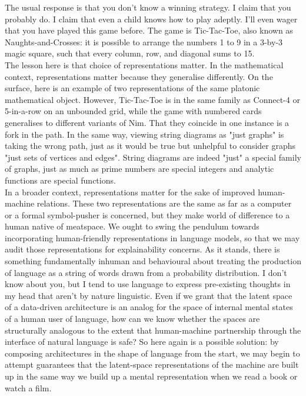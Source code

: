 The usual response is that you don't know a winning strategy. I claim that you probably do. I claim that even a child knows how to play adeptly. I'll even wager that you have played this game before. The game is Tic-Tac-Toe, also known as Naughts-and-Crosses: it is possible to arrange the numbers 1 to 9 in a 3-by-3 magic square, such that every column, row, and diagonal sums to 15.\\

The lesson here is that choice of representations matter. In the mathematical context, representations matter because they generalise differently. On the surface, here is an example of two representations of the same platonic mathematical object. However, Tic-Tac-Toe is in the same family as Connect-4 or 5-in-a-row on an unbounded grid, while the game with numbered cards generalises to different variants of Nim. That they coincide in one instance is a fork in the path. In the same way, viewing string diagrams as "just graphs" is taking the wrong path, just as it would be true but unhelpful to consider graphs "just sets of vertices and edges". String diagrams are indeed "just" a special family of graphs, just as much as prime numbers are special integers and analytic functions are special functions.\\

In a broader context, representations matter for the sake of improved human-machine relations. These two representations are the same as far as a computer or a formal symbol-pusher is concerned, but they make world of difference to a human native of meatspace. We ought to swing the pendulum towards incorporating human-friendly representations in language models, so that we may audit those representations for explainability concerns. As it stands, there is something fundamentally inhuman and behavioural about treating the production of language as a string of words drawn from a probability distribution. I don't know about you, but I tend to use language to express pre-existing thoughts in my head that aren't by nature linguistic. Even if we grant that the latent space of a data-driven architecture is an analog for the space of internal mental states of a human user of language, how can we know whether the spaces are structurally analogous to the extent that human-machine partnership through the interface of natural language is safe? So here again is a possible solution: by composing architectures in the shape of language from the start, we may begin to attempt guarantees that the latent-space representations of the machine are built up in the same way we build up a mental representation when we read a book or watch a film.

